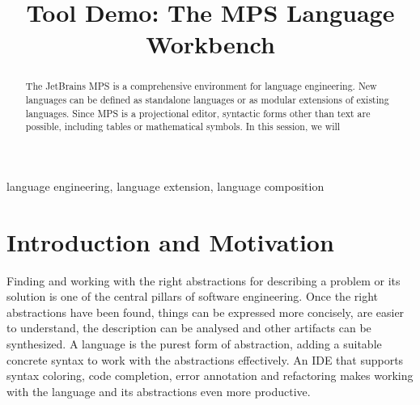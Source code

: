 \documentclass[10pt, conference, compsocconf]{IEEEtran}
\begin{document}
%
\title{Tool Demo: The MPS Language Workbench}



\author{
\and
{}
}

\newcommand\todo[1]{\mynote{TODO}{#1}} 
\newcommand{\fig}[1]{Fig.~\ref{#1}}
\newcommand{\sect}[1]{Section~\ref{#1}}
\newcommand{\ic}[1]{\changefont{cmtt}{m}{n}{#1}\normalfont}  %
\newcommand{\lcr}[1]{\changefont{cmtt}{m}{n}{#1}\normalfont} %

\newcommand{\pp}[1]{ \vspace{2mm}\noindent\textbf{{#1}} }


\maketitle


\begin{abstract}
The JetBrains MPS is a comprehensive environment for language engineering.
New languages can be defined as standalone languages or as modular extensions of
existing languages. Since MPS is a projectional editor, syntactic forms other
than text are possible, including tables or mathematical symbols. In this
session, we will \todo{}
\end{abstract}

\begin{IEEEkeywords}
language engineering, language extension, language composition
\end{IEEEkeywords}

\section{Introduction and Motivation}

\noindent
Finding and working with the right abstractions for describing a
problem or its solution is one of the central pillars of software engineering.
Once the right abstractions have been found, things can be expressed more
concisely, are easier to understand, the description can be analysed and other
artifacts can be synthesized. A language is the purest form of abstraction,
adding a suitable concrete syntax to work with the abstractions effectively. An
IDE that supports syntax coloring, code completion, error annotation and
refactoring makes working with the language and its abstractions even more
productive.
\end{document}
